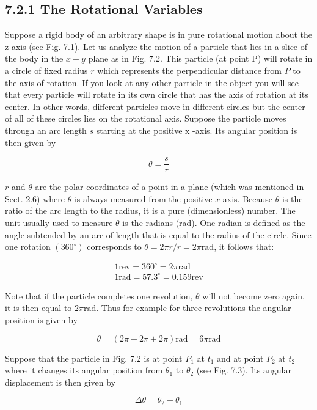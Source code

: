 \documentclass[10pt]{article}
\begin{document}
\subsection*{7.2.1 The Rotational Variables}
Suppose a rigid body of an arbitrary shape is in pure rotational motion about the z-axis (see Fig. 7.1). Let us analyze the motion of a particle that lies in a slice of the body in the $x-y$ plane as in Fig. 7.2. This particle (at point P) will rotate in a circle of fixed radius $r$ which represents the perpendicular distance from $P$ to the axis of rotation. If you look at any other particle in the object you will see that every particle will rotate in its own circle that has the axis of rotation at its center. In other words, different particles move in different circles but the center of all of these circles lies on the rotational axis. Suppose the particle moves through an arc length $s$ starting at the positive x -axis. Its angular position is then given by

$$
\theta=\frac{s}{r}
$$

$r$ and $\theta$ are the polar coordinates of a point in a plane (which was mentioned in Sect. 2.6) where $\theta$ is always measured from the positive $x$-axis. Because $\theta$ is the ratio of the arc length to the radius, it is a pure (dimensionless) number. The unit usually used to measure $\theta$ is the radians (rad). One radian is defined as the angle subtended by an arc of length that is equal to the radius of the circle. Since one rotation $\left(360^{\circ}\right)$ corresponds to $\theta=2 \pi r / r=2 \pi \mathrm{rad}$, it follows that:

$$
\begin{gathered}
1 \mathrm{rev}=360^{\circ}=2 \pi \mathrm{rad} \\
1 \mathrm{rad}=57.3^{\circ}=0.159 \mathrm{rev}
\end{gathered}
$$

Note that if the particle completes one revolution, $\theta$ will not become zero again, it is then equal to $2 \pi \mathrm{rad}$. Thus for example for three revolutions the angular position is given by

$$
\theta=(2 \pi+2 \pi+2 \pi) \mathrm{rad}=6 \pi \mathrm{rad}
$$

Suppose that the particle in Fig. 7.2 is at point $P_{1}$ at $t_{1}$ and at point $P_{2}$ at $t_{2}$ where it changes its angular position from $\theta_{1}$ to $\theta_{2}$ (see Fig. 7.3). Its angular displacement is then given by

$$
\Delta \theta=\theta_{2}-\theta_{1}
$$
\end{document}
